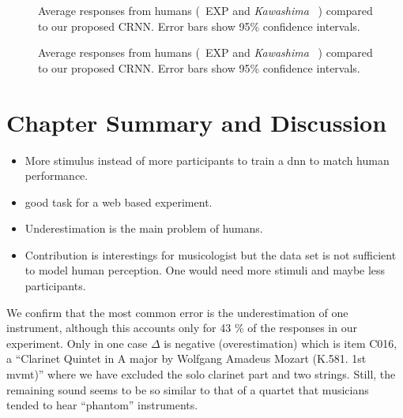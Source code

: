 \begin{figure}[t!]
    \centering
    \begin{adjustbox}{width=0.7\columnwidth}
      
    \end{adjustbox}
    \caption{Average responses from humans (\
    {EXP} and \emph{Kawashima}
~\cite{kawashima15}) compared to our proposed CRNN. Error bars show 95\% confidence intervals.}%
    \label{fig:experiment}
 \end{figure}

\begin{figure}[t!]
   \centering
   \begin{adjustbox}{width=0.7\columnwidth}
     
   \end{adjustbox}
   \caption{Average responses from humans (\
   {EXP} and \emph{Kawashima}
~\cite{kawashima15}) compared to our proposed CRNN. Error bars show 95\% confidence intervals.}%
   \label{fig:experiment}
\end{figure}

 \section{Chapter Summary and Discussion}

\begin{itemize}
  \item More stimulus instead of more participants to train a dnn to match human performance.
  \item good task for a web based experiment.
  \item Underestimation is the main problem of humans.
  \item Contribution is interestings for musicologist but the data set is not sufficient to model human perception. One would need more stimuli and maybe less participants. 
\end{itemize}

We confirm \cite{huron89} that the most common error is the underestimation of one instrument, although this accounts only for 43 \% of the responses in our experiment. Only in one case $\Delta$ is negative (overestimation) which is item C016, a ``Clarinet Quintet in A major by Wolfgang Amadeus Mozart (K.581. 1st mvmt)'' where we have excluded the solo clarinet part and two strings. Still, the remaining sound seems to be so similar to that of a quartet that musicians tended to hear ``phantom'' instruments.
\vspace{-1.0em}
